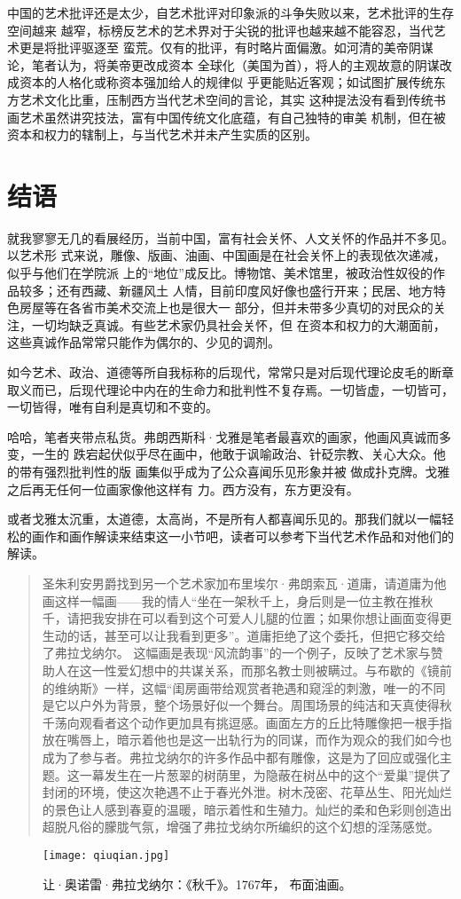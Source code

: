 中国的艺术批评还是太少，自艺术批评对印象派的斗争失败以来，艺术批评的生存空间越来
越窄，标榜反艺术的艺术界对于尖锐的批评也越来越不能容忍，当代艺术更是将批评驱逐至
蛮荒。仅有的批评，有时略片面偏激。如河清的美帝阴谋论，笔者认为，将美帝更改成资本
全球化（美国为首），将人的主观故意的阴谋改成资本的人格化或称资本强加给人的规律似
乎更能贴近客观；如试图扩展传统东方艺术文化比重，压制西方当代艺术空间的言论，其实
这种提法没有看到传统书画艺术虽然讲究技法，富有中国传统文化底蕴，有自己独特的审美
机制，但在被资本和权力的辖制上，与当代艺术并未产生实质的区别。


\section{结语}

就我寥寥无几的看展经历，当前中国，富有社会关怀、人文关怀的作品并不多见。以艺术形
式来说，雕像、版画、油画、中国画是在社会关怀上的表现依次递减，似乎与他们在学院派
上的“地位”成反比。博物馆、美术馆里，被政治性奴役的作品较多；还有西藏、新疆风土
人情，目前印度风好像也盛行开来；民居、地方特色房屋等在各省市美术交流上也是很大一
部分，但并未带多少真切的对民众的关注，一切均缺乏真诚。有些艺术家仍具社会关怀，但
在资本和权力的大潮面前，这些真诚作品常常只能作为偶尔的、少见的调剂。

如今艺术、政治、道德等所自我标称的后现代，常常只是对后现代理论皮毛的断章取义而已，后现代理论中内在的生命力和批判性不复存焉。一切皆虚，一切皆可，一切皆得，唯有自利是真切和不变的。

哈哈，笔者夹带点私货。弗朗西斯科·戈雅是笔者最喜欢的画家，他画风真诚而多变，一生的
跌宕起伏似乎尽在画中，他敢于讽喻政治、针砭宗教、关心大众。他的带有强烈批判性的版
画集似乎成为了公众喜闻乐见形象并被 做成扑克牌。戈雅之后再无任何一位画家像他这样有
力。西方没有，东方更没有。

或者戈雅太沉重，太道德，太高尚，不是所有人都喜闻乐见的。那我们就以一幅轻松的画作和画作解读来结束这一小节吧，读者可以参考下当代艺术作品和对他们的解读。

\begin{quotation}
  圣朱利安男爵找到另一个艺术家加布里埃尔·弗朗索瓦·道庸，请道庸为他画这样一幅画——我的情人“坐在一架秋千上，身后则是一位主教在推秋千，请把我安排在可以看到这个可爱人儿腿的位置；如果你想让画面变得更生动的话，甚至可以让我看到更多”。道庸拒绝了这个委托，但把它移交给了弗拉戈纳尔。
  这幅画是表现“风流韵事”的一个例子，反映了艺术家与赞助人在这一性爱幻想中的共谋关系，而那名教士则被瞒过。与布歇的《镜前的维纳斯》一样，这幅“闺房画带给观赏者艳遇和窥淫的刺激，唯一的不同是它以户外为背景，整个场景好似一个舞台。周围场景的纯洁和天真使得秋千荡向观看者这个动作更加具有挑逗感。画面左方的丘比特雕像把一根手指放在嘴唇上，暗示着他也是这一出轨行为的同谋，而作为观众的我们如今也成为了参与者。弗拉戈纳尔的许多作品中都有雕像，这是为了回应或强化主题。这一幕发生在一片葱翠的树荫里，为隐蔽在树丛中的这个“爱巢”提供了封闭的环境，使这次艳遇不止于春光外泄。树木茂密、花草丛生、阳光灿烂的景色让人感到春夏的温暖，暗示着性和生殖力。灿烂的柔和色彩则创造出超脱凡俗的朦胧气氛，增强了弗拉戈纳尔所编织的这个幻想的淫荡感觉。\cite[765]{9787510048623}
\end{quotation}

\clearpage
\begin{figure}[t]
  \centering
  \texttt{[image: qiuqian.jpg]}
  \caption[让·奥诺雷·弗拉戈纳尔：《秋千》]{让·奥诺雷·弗拉戈纳尔：《秋千》。1767年，
    布面油画。}\label{fig:qiuqian}
\end{figure}
